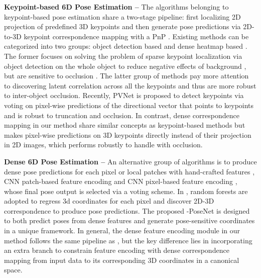 \documentclass[letterpaper, 10 pt, conference]{ieeeconf}
\begin{document}
\vspace{0.1cm}\noindent\textbf{Keypoint-based 6D Pose Estimation --} The algorithms belonging to keypoint-based pose estimation share a two-stage pipeline: first localizing 2D projection of predefined 3D keypoints and then generate pose predictions via 2D-to-3D keypoint correspondence mapping with a PnP \cite{fischler1981random}. 
Existing methods can be categorized into two groups: object detection based \cite{rad2017bb8,tekin2018real} and dense heatmap based \cite{oberweger2018making,pavlakos20176}.
The former focuses on solving the problem of sparse keypoint localization via object detection on the whole object to reduce negative effects of background \cite{rad2017bb8,tekin2018real}, but are sensitive to occlusion \cite{oberweger2018making}. 
The latter group of methods \cite{oberweger2018making,pavlakos20176} pay more attention to discovering latent correlation across all the keypoints and thus are more robust to inter-object occlusion.
Recently, PVNet \cite{peng2019pvnet} is proposed to detect keypoints via voting on pixel-wise predictions of the directional vector that points to keypoints and is robust to truncation and occlusion.
In contrast, dense correspondence mapping in our method share similar concepts as keypoint-based methods but makes pixel-wise predictions on 3D keypoints directly instead of their projection in 2D images, which performs robustly to handle with occlusion. 

\vspace{0.1cm}\noindent\textbf{Dense 6D Pose Estimation --} An alternative group of algorithms is to produce dense pose predictions for each pixel or local patches with hand-crafted features \cite{liebelt2008independent,sun2010depth}, CNN patch-based feature encoding \cite{doumanoglou2016recovering,kehl2016deep} and CNN pixel-based feature encoding \cite{wang2019densefusion,cheng20196d}, whose final pose output is selected via a voting scheme.
In \cite{brachmann2014learning,michel2017global}, random forests are adopted to regress 3d coordinates for each pixel and discover 2D-3D correspondence to produce pose predictions. 
The proposed -PoseNet is designed to both predict poses from dense features and generate pose-sensitive coordinates in a unique framework.
In general, the dense feature encoding module in our method follows the same pipeline as \cite{wang2019densefusion,cheng20196d}, but the key difference lies in incorporating an extra branch to constrain feature encoding with dense correspondence mapping from input data to its corresponding 3D coordinates in a canonical space.  
\end{document}
